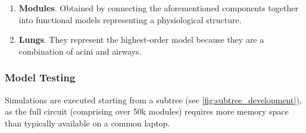 \begin{enumerate}
\item \textbf{Modules}.  Obtained by connecting the aforementioned
  components together into functional models representing a
  physiological structure.
\item \textbf{Lungs}.  They represent the highest-order model because they are a combination of
  acini and airways.
\end{enumerate}

\vspace{2.25em}



\vspace{2.25em}




\subsubsection{Model Testing}
\label{subsubsec:model_testing}

Simulations are executed starting from a subtree (see
\cref{fig:subtree_development}), as the full circuit (comprising over
50k modules) requires more memory space than typically available on a
common laptop.


\vspace{2.25em}






